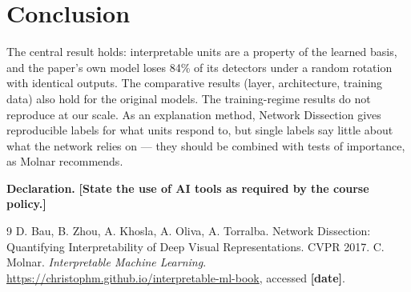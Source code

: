 \documentclass[10pt,a4paper]{article}
\newcommand{\fillin}[1]{\colorbox{yellow!40}{\textbf{[#1]}}}
\begin{document}
\section{Conclusion}
The central result holds: interpretable units are a property of the learned basis, and the paper's own model loses 84\% of
its detectors under a random rotation with identical outputs. The comparative results (layer, architecture, training data)
also hold for the original models. The training-regime results do not reproduce at our scale. As an explanation method,
Network Dissection gives reproducible labels for what units respond to, but single labels say little about what the network
relies on --- they should be combined with tests of importance, as Molnar recommends.

\noindent\textbf{Declaration.} \fillin{State the use of AI tools as required by the course policy.}

\begin{thebibliography}{9}\small
{} D. Bau, B. Zhou, A. Khosla, A. Oliva, A. Torralba. Network Dissection: Quantifying Interpretability of Deep Visual Representations. CVPR 2017.
 C. Molnar. \emph{Interpretable Machine Learning}. \url{https://christophm.github.io/interpretable-ml-book}, accessed \fillin{date}.
\end{thebibliography}
\end{document}
